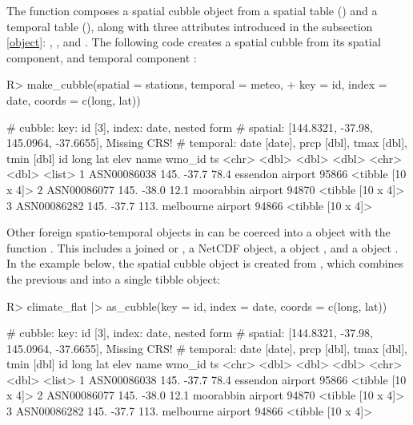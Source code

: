 \documentclass[
  shortnames]{jss}
\begin{document}
The function  composes a spatial cubble object from a spatial table () and a temporal table (), along with three attributes introduced in the subsection \ref{object}: , , and . The following code creates a spatial cubble from its spatial component,  and temporal component :

\begin{CodeChunk}
\begin{CodeInput}
R> make_cubble(spatial = stations, temporal = meteo,
+             key = id, index = date, coords = c(long, lat))
\end{CodeInput}
\begin{CodeOutput}
# cubble:   key: id [3], index: date, nested form
# spatial:  [144.8321, -37.98, 145.0964, -37.6655], Missing CRS!
# temporal: date [date], prcp [dbl], tmax [dbl], tmin [dbl]
  id           long   lat  elev name              wmo_id ts               
  <chr>       <dbl> <dbl> <dbl> <chr>              <dbl> <list>           
1 ASN00086038  145. -37.7  78.4 essendon airport   95866 <tibble [10 x 4]>
2 ASN00086077  145. -38.0  12.1 moorabbin airport  94870 <tibble [10 x 4]>
3 ASN00086282  145. -37.7 113.  melbourne airport  94866 <tibble [10 x 4]>
\end{CodeOutput}
\end{CodeChunk}

Other foreign spatio-temporal objects in  can be coerced into a  object with the function . This includes a joined  or , a NetCDF object, a  object \citep{stars}, and a  object \citep{sftime}. In the example below, the spatial cubble object is created from , which combines the previous  and  into a single tibble object:

\begin{CodeChunk}
\begin{CodeInput}
R> climate_flat |> as_cubble(key = id, index = date, coords = c(long, lat))
\end{CodeInput}
\begin{CodeOutput}
# cubble:   key: id [3], index: date, nested form
# spatial:  [144.8321, -37.98, 145.0964, -37.6655], Missing CRS!
# temporal: date [date], prcp [dbl], tmax [dbl], tmin [dbl]
  id           long   lat  elev name              wmo_id ts               
  <chr>       <dbl> <dbl> <dbl> <chr>              <dbl> <list>           
1 ASN00086038  145. -37.7  78.4 essendon airport   95866 <tibble [10 x 4]>
2 ASN00086077  145. -38.0  12.1 moorabbin airport  94870 <tibble [10 x 4]>
3 ASN00086282  145. -37.7 113.  melbourne airport  94866 <tibble [10 x 4]>
\end{CodeOutput}
\end{CodeChunk}
\end{document}
